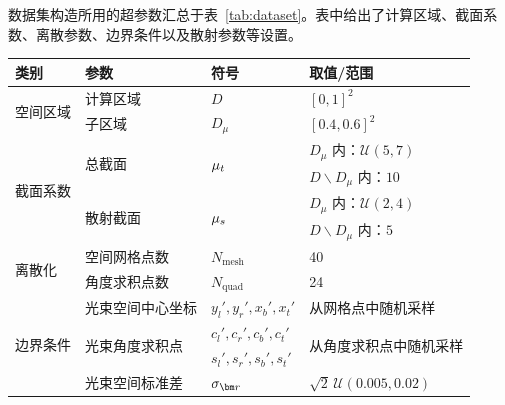数据集构造所用的超参数汇总于表~\ref{tab:dataset}。表中给出了计算区域、截面系数、离散参数、边界条件以及散射参数等设置。
\begin{table}[!htp]
    \centering
    \begin{tabular}{lp{}ll}
        \toprule
        类别                    & 参数                       & 符号                       & 取值/范围                                \\ \midrule
        \multirow{2}{*}{空间区域} & 计算区域                     & $D$                      & ${[0,1]}^2$                          \\
                              & 子区域                      & $D_\mu$                  & ${[0.4,0.6]}^2$                      \\
        \midrule
        \multirow{4}{*}{截面系数} & \multirow{2}{*}{总截面}     & \multirow{2}{*}{$\mu_t$}  & $D_\mu$ 内：$\mathcal{U}(5,7)$         \\
                              &                          &                          & $D\backslash D_\mu$ 内：$10$           \\
                              & \multirow{2}{*}{散射截面}    & \multirow{2}{*}{$\mu_s$}  & $D_\mu$ 内：$\mathcal{U}(2,4)$         \\
                              &                          &                          & $D\backslash D_\mu$ 内：$5$            \\
        \midrule
        \multirow{2}{*}{离散化}  & 空间网格点数                   & $N_{\text{mesh}}$        & 40                                   \\
                              & 角度求积点数                   & $N_\text{quad}$          & 24                                   \\ \midrule
        \multirow{5}{*}{边界条件} & 光束空间中心坐标                 & $y_l', y_r', x_b', x_t'$ & 从网格点中随机采样                            \\
                              & \multirow{2}{*}{光束角度求积点} & $c_l', c_r', c_b', c_t'$ & \multirow{2}{*}{从角度求积点中随机采样}         \\
                              &                          & $s_l', s_r', s_b', s_t'$ &                                      \\
                              & 光束空间标准差                  & $\sigma_{\br}$           & $\sqrt{2}\,\mathcal{U}(0.005, 0.02)$ \\

\end{tabular}
\end{table}
